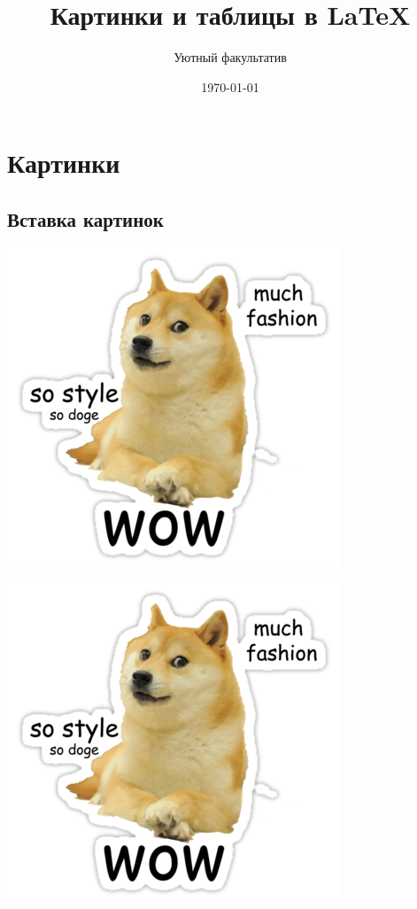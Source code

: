 \documentclass[12pt, a4paper]{article}
\author{Уютный факультатив}
\title{Картинки и таблицы в \LaTeX}
\date{\today}
\begin{document}
 

\maketitle

\section{Картинки}
\subsection{Вставка картинок}

\includegraphics{doge.png}


\includegraphics[scale=0.5]{doge.png} 
\end{document}
